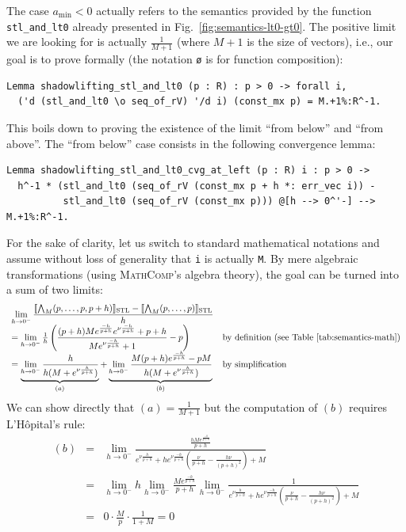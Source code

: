 \documentclass[a4paper,UKenglish,cleveref, autoref, thm-restate]{lipics-v2021}
\def\coqin#1{\texttt{#1}}
\newcommand{\naryConj}{\bigwedge\nolimits_M}
\def\STL{\textrm{STL}}
\newcommand{\tSTL}[1]{\llbracket #1 \rrbracket_{\STL}}
\newcommand{\pval}{p}
\def\mathcomp{\textsc{MathComp}}
\begin{document}
The case $a_{\min} < 0$ actually refers to the semantics provided
by the function \coqin{stl_and_lt0} already presented in
Fig.~\ref{fig:semantics-lt0-gt0}.
%
The positive limit we are looking for is actually $\frac{1}{M+1}$
(where $M+1$ is the size of vectors), i.e., our goal is to prove formally
(the notation \coqin{\o} is for function composition):
\begin{verbatim}
Lemma shadowlifting_stl_and_lt0 (p : R) : p > 0 -> forall i,
  ('d (stl_and_lt0 \o seq_of_rV) '/d i) (const_mx p) = M.+1%:R^-1.
\end{verbatim}
This boils down to proving the existence of the limit ``from below''
and ``from above''.
%
The ``from below'' case consists in the following convergence lemma:
\begin{verbatim}
Lemma shadowlifting_stl_and_lt0_cvg_at_left (p : R) i : p > 0 ->
  h^-1 * (stl_and_lt0 (seq_of_rV (const_mx p + h *: err_vec i)) -
          stl_and_lt0 (seq_of_rV (const_mx p))) @[h --> 0^'-] --> M.+1%:R^-1.
\end{verbatim}
For the sake of clarity, let us switch to standard mathematical
notations and assume without loss of generality that \coqin{i} is actually \coqin{M}.
By mere algebraic transformations (using \mathcomp's algebra theory),
the goal can be turned into a sum of two limits:
$$
\begin{array}{ll}
\lim\limits_{h \rightarrow 0^-} \dfrac{\tSTL{\naryConj(\pval, \ldots, \pval, 
		\pval + h)} - \tSTL{\naryConj(\pval, \ldots, \pval)}}{h} \\ 
= \lim\limits_{h \rightarrow 0^-} \frac{1}{h} \left(
	\dfrac{(\pval + h) M e^{\frac{-h}{\pval+h}} e^{\nu 
	\frac{-h}{\pval+h}} + \pval + h }{Me^{\nu \frac{-h}{\pval+h}} + 1}
	- p
	\right) & \text{by definition (see Table~\ref{tab:semantics-math})}\\
= \underbrace{\lim\limits_{h \rightarrow 0^-} \frac{h}{h(M + e^{\nu \frac{h}{\pval+h}})}}_{(a)}
 +
\underbrace{\lim\limits_{h \rightarrow 0^-} \frac{M (\pval + 
h)e^{\frac{-h}{\pval+h}} - \pval M }{h(M + e^{\nu \frac{h}{\pval+h}})}}_{(b)} & 
\text{by simplification} \\
\end{array}
$$
We can show directly that $(a)=\frac{1}{M+1}$
but the computation of $(b)$ requires L'H\^opital's rule:
$$
\begin{array}{rcl}
(b) & = & \lim\limits_{h \rightarrow 0^-} \frac{\frac{h M 
	e^{\frac{-h}{\pval+h}}}{\pval + h}}
	{e^{\nu \frac{h}{\pval+h}} +
	h e^{\nu\frac{-h}{\pval+h}}(\frac{\nu}{\pval + h} - \frac{h \nu}{(\pval 
	+h)^2}) + M} \\
& = & \lim\limits_{h \rightarrow 0^-} h 
	\lim\limits_{h \rightarrow 0^-} \frac{M e^{\frac{-h}{\pval+h}}}{\pval + h}
	\lim\limits_{h \rightarrow 0^-} \frac{1}{e^{\nu \frac{h}{\pval+h}} +
		h e^{\nu\frac{-h}{\pval+h}}(\frac{\nu}{\pval + h} - \frac{h 
		\nu}{(\pval 
			+h)^2}) + M} \\
& = & 0 \cdot \frac{M}{\pval} \cdot \frac{1}{1 + M} = 0 \\
\end{array}
$$
 
\end{document}
